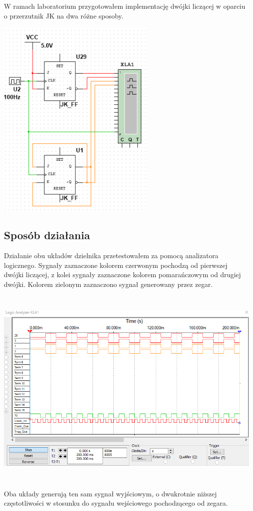 \documentclass{article}
\begin{document}
            W ramach laboratorium przygotowałem implementację dwójki liczącej w oparciu o przerzutnik JK na dwa różne sposoby. 
            \begin{center}
                \includegraphics[height=10cm]{reports/img/Z3A_1.png}\\
            \end{center}
        
        \subsection{Sposób działania}
            Działanie obu układów dzielnika przetestowałem za pomocą analizatora logicznego. Sygnały zaznaczone kolorem czerwonym pochodzą od pierwszej dwójki liczącej, z kolei sygnały zaznaczone kolorem pomarańczowym od drugiej dwójki. Kolorem zielonym zaznaczono sygnał generowany przez zegar. 
            \begin{center}
                \includegraphics[height=10cm]{reports/img/Z3A_2.png}\\
            \end{center}
            Oba układy generują ten sam sygnał wyjściowym, o dwukrotnie niższej częstotliwości w stosunku do sygnału wejściowego pochodzącego od zegara. 
            
\end{document}
